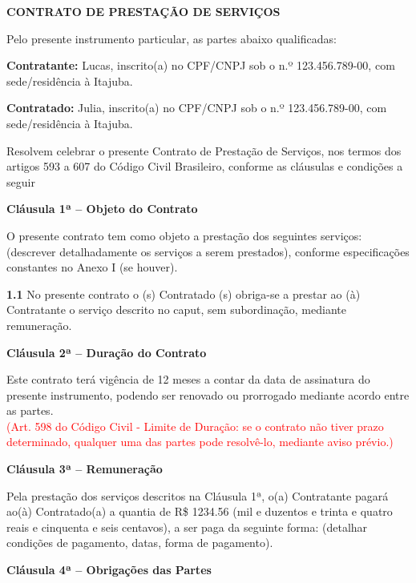 \documentclass[a4paper,12pt]{article}
\begin{document}
\large{\textbf{CONTRATO DE PRESTAÇÃO DE SERVIÇOS}}

\normalsize
Pelo presente instrumento particular, as partes abaixo qualificadas:

\noindent \textbf{Contratante:} Lucas, inscrito(a) no CPF/CNPJ sob o n.º 123.456.789-00, com sede/residência à Itajuba.

\noindent \textbf{Contratado:} Julia, inscrito(a) no CPF/CNPJ sob o n.º 123.456.789-00, com sede/residência à Itajuba.

\noindent Resolvem celebrar o presente Contrato de Prestação de Serviços, nos termos dos artigos 593 a 607 do Código Civil Brasileiro, conforme as cláusulas e condições a seguir
\vspace{0.5cm}

\large{\textbf{Cláusula 1ª – Objeto do Contrato}}
\normalsize

O presente contrato tem como objeto a prestação dos seguintes serviços: (descrever detalhadamente os serviços a serem prestados), conforme especificações constantes no Anexo I (se houver).

\textbf{1.1} No presente contrato o (s)  Contratado (s) obriga-se a prestar ao (à) Contratante o serviço descrito no caput, sem subordinação, mediante remuneração.

\large{\textbf{Cláusula 2ª – Duração do Contrato}}
\normalsize

Este contrato terá vigência de 12 meses a contar da data de assinatura do presente instrumento, podendo ser renovado ou prorrogado mediante acordo entre as partes.\\
\textcolor{red}{(Art. 598 do Código Civil - Limite de Duração: se o contrato não tiver prazo determinado, qualquer uma das partes pode resolvê-lo, mediante aviso prévio.)}

\large{\textbf{Cláusula 3ª – Remuneração}}
\normalsize

Pela prestação dos serviços descritos na Cláusula 1ª, o(a) Contratante pagará ao(à) Contratado(a) a quantia de R\$ 1234.56 (mil e duzentos e trinta e quatro reais e cinquenta e seis centavos), a ser paga da seguinte forma: (detalhar condições de pagamento, datas, forma de pagamento).

\large{\textbf{Cláusula 4ª – Obrigações das Partes}}
\normalsize
\end{document}
